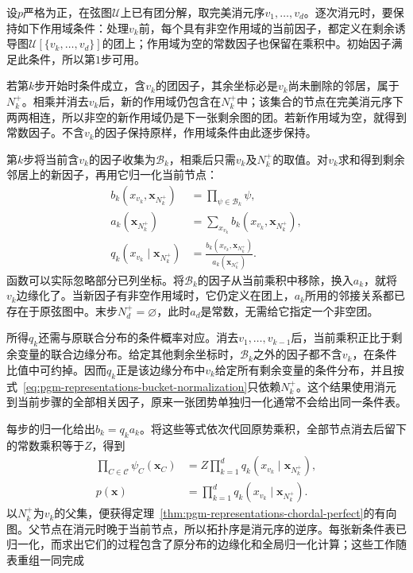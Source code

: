 设$p$严格为正，在弦图$\mathcal{U}$上已有团分解，取完美消元序$v_1,\ldots,v_d$。逐次消元时，要保持如下作用域条件：处理$v_k$前，每个具有非空作用域的当前因子，都定义在剩余诱导图$\mathcal{U}[\{v_k,\ldots,v_d\}]$的团上；作用域为空的常数因子也保留在乘积中。初始因子满足此条件，所以第$1$步可用。

若第$k$步开始时条件成立，含$v_k$的团因子，其余坐标必是$v_k$尚未删除的邻居，属于$N_k^+$。相乘并消去$v_k$后，新的作用域仍包含在$N_k^+$中；该集合的节点在完美消元序下两两相连，所以非空的新作用域仍是下一张剩余图的团。若新作用域为空，就得到常数因子。不含$v_k$的因子保持原样，作用域条件由此逐步保持。

第$k$步将当前含$v_k$的因子收集为$\mathcal{B}_k$，相乘后只需$v_k$及$N_k^+$的取值。对$v_k$求和得到剩余邻居上的新因子，再用它归一化当前节点：
\begin{equation}
  \begin{aligned}
    b_k(x_{v_k},\bm{x}_{N_k^+})
    &=\prod_{\psi\in\mathcal{B}_k}\psi,\\
    a_k(\bm{x}_{N_k^+})
    &=\sum_{x_{v_k}}b_k(x_{v_k},\bm{x}_{N_k^+}),\\
    q_k(x_{v_k}\mid\bm{x}_{N_k^+})
    &=\frac{b_k(x_{v_k},\bm{x}_{N_k^+})}
    {a_k(\bm{x}_{N_k^+})}.
  \end{aligned}
  \label{eq:pgm-representations-bucket-normalization}
\end{equation}
函数可以实际忽略部分已列坐标。将$\mathcal{B}_k$的因子从当前乘积中移除，换入$a_k$，就将$v_k$边缘化了。当新因子有非空作用域时，它仍定义在团上，$a_k$所用的邻接关系都已存在于原弦图中。末步$N_d^+=\varnothing$，此时$a_d$是常数，无需给它指定一个非空团。

所得$q_k$还需与原联合分布的条件概率对应。消去$v_1,\ldots,v_{k-1}$后，当前乘积正比于剩余变量的联合边缘分布。给定其他剩余坐标时，$\mathcal{B}_k$之外的因子都不含$v_k$，在条件比值中可约掉。因而$q_k$正是该边缘分布中$v_k$给定所有剩余变量的条件分布，并且按式~\eqref{eq:pgm-representations-bucket-normalization}只依赖$N_k^+$。这个结果使用消元到当前步骤的全部相关因子，原来一张团势单独归一化通常不会给出同一条件表。

每步的归一化给出$b_k=q_k a_k$。将这些等式依次代回原势乘积，全部节点消去后留下的常数乘积等于$Z$，得到
\begin{equation}
  \begin{aligned}
    \prod_{C\in\mathcal{C}}\psi_C(\bm{x}_C)
    &=Z\prod_{k=1}^d q_k(x_{v_k}\mid\bm{x}_{N_k^+}),\\
    p(\bm{x})&=\prod_{k=1}^d q_k(x_{v_k}\mid\bm{x}_{N_k^+}).
  \end{aligned}
  \label{eq:pgm-representations-telescoping-product}
\end{equation}
以$N_k^+$为$v_k$的父集，便获得定理~\ref{thm:pgm-representations-chordal-perfect}的有向图。父节点在消元时晚于当前节点，所以拓扑序是消元序的逆序。每张新条件表已归一化，而求出它们的过程包含了原分布的边缘化和全局归一化计算；这些工作随表重组一同完成

